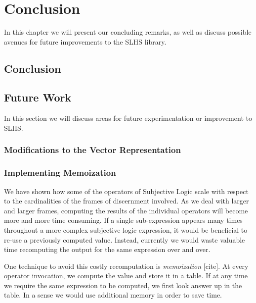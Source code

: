 \documentclass[thesis.tex]{subfiles}
\begin{document}
\chapter{Conclusion}
\label{chap:conclusion}

In this chapter we will present our concluding remarks, as well as discuss possible avenues for
future improvements to the SLHS library.






\section{Conclusion}





\section{Future Work}

In this section we will discuss areas for future experimentation or improvement to SLHS.


\subsection{Modifications to the Vector Representation}





\subsection{Implementing Memoization}

We have shown how some of the operators of Subjective Logic scale with respect
to the cardinalities of the frames of discernment involved. As we deal with
larger and larger frames, computing the results of the individual operators
will become more and more time consuming. If a single sub-expression appears
many times throughout a more complex subjective logic expression, it would be
beneficial to re-use a previously computed value. Instead, currently we would waste
valuable time recomputing the output for the same expression over and over.

One technique to avoid this costly recomputation is \emph{memoization} [cite].
At every operator invocation, we compute the value and store it in a table. If at
any time we require the same expression to be computed, we first look answer up in
the table. In a sense we would use additional memory in order to save time.
\end{document}
